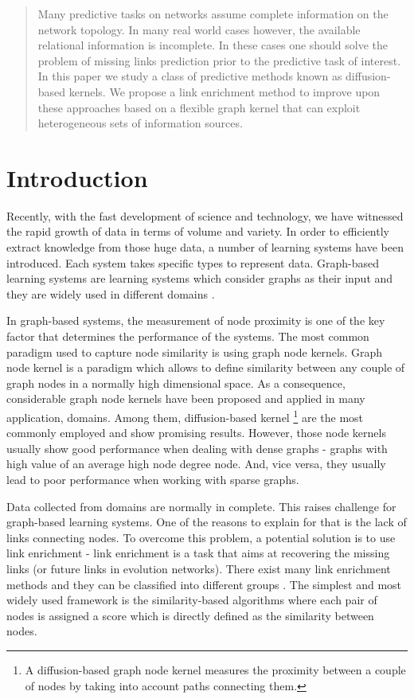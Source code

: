 \documentclass{article}
\begin{document}
\begin{abstract}
Many predictive tasks on networks assume complete information on the network topology. In many real world cases however, the available relational information is incomplete. In these cases one should solve the problem of missing links prediction prior to the predictive task of interest.
In this paper we study a class of predictive methods known as  diffusion-based kernels. We propose a link enrichment method to improve upon these approaches based on a flexible graph kernel that can exploit heterogeneous sets of information sources. 
\end{abstract} 

\section{Introduction}
\label{introduction}
Recently, with the fast development of science and technology, we have witnessed the rapid growth of data in terms of volume and variety. In order to efficiently extract knowledge from those huge data, a number of learning systems have been introduced. Each system takes specific types to represent data. Graph-based learning systems are learning systems which consider graphs as their input and they are widely used in different domains \cite{references here}.

In graph-based systems, the measurement of node proximity is one of the key factor that determines the performance of the systems. The most common paradigm used to capture node similarity is using graph node kernels. Graph node kernel is a paradigm which allows to define similarity between any couple of graph nodes in a normally high dimensional space. As a consequence, considerable graph node kernels have been proposed and applied in many application, domains. Among them, diffusion-based kernel \footnote{A diffusion-based graph node kernel measures the proximity between a couple of nodes by taking into account paths connecting them.} are the most commonly employed and show promising results. However, those node kernels usually show good performance when dealing with dense graphs - graphs with high value of an average high node degree node. And, vice versa, they usually lead to poor performance when working with sparse graphs.

Data collected from domains are normally in complete. This raises challenge for graph-based learning systems. One of the reasons to explain for that is the lack of links connecting nodes. To overcome this problem, a potential solution is to use link enrichment - link enrichment is a task that aims at recovering the missing links (or future links in evolution networks). There exist many link enrichment methods and they can be classified into different groups \cite{ref-here}. The simplest and most widely used framework is the similarity-based algorithms where each pair of nodes is assigned a score which is directly defined as the similarity between nodes.
\end{document}
